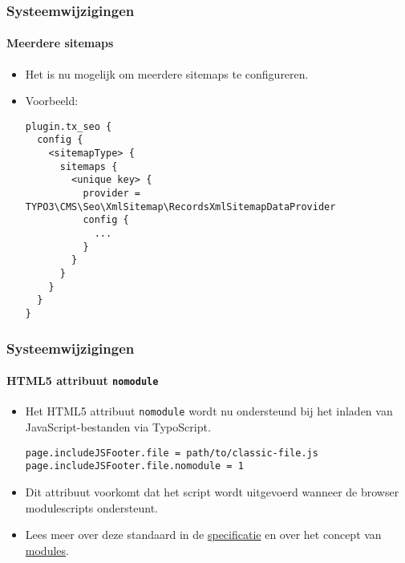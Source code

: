 
\begin{frame}[fragile]
	\frametitle{Systeemwijzigingen}
	\framesubtitle{Meerdere sitemaps}

	\lstset{basicstyle=\tiny\ttfamily}

	\begin{itemize}

		\item Het is nu mogelijk om meerdere sitemaps te configureren.
		\item Voorbeeld:
\begin{lstlisting}
plugin.tx_seo {
  config {
    <sitemapType> {
      sitemaps {
        <unique key> {
          provider = TYPO3\CMS\Seo\XmlSitemap\RecordsXmlSitemapDataProvider
          config {
            ...
          }
        }
      }
    }
  }
}
\end{lstlisting}

	\end{itemize}

\end{frame}


\begin{frame}[fragile]
	\frametitle{Systeemwijzigingen}
	\framesubtitle{HTML5 attribuut \texttt{nomodule}}

	\lstset{basicstyle=\tiny\ttfamily}

	\begin{itemize}
		\item Het HTML5 attribuut \texttt{nomodule} wordt nu ondersteund bij het inladen van JavaScript-bestanden via TypoScript.
\begin{lstlisting}
page.includeJSFooter.file = path/to/classic-file.js
page.includeJSFooter.file.nomodule = 1
\end{lstlisting}

		\item Dit attribuut voorkomt dat het script wordt uitgevoerd wanneer de browser modulescripts ondersteunt.

		\item Lees meer over deze standaard in de
			\href{https://html.spec.whatwg.org/multipage/scripting.html#attr-script-nomodule}{specificatie}
			en over het concept van
			\href{https://hacks.mozilla.org/2015/08/es6-in-depth-modules/}{modules}.

	\end{itemize}


\end{frame}

